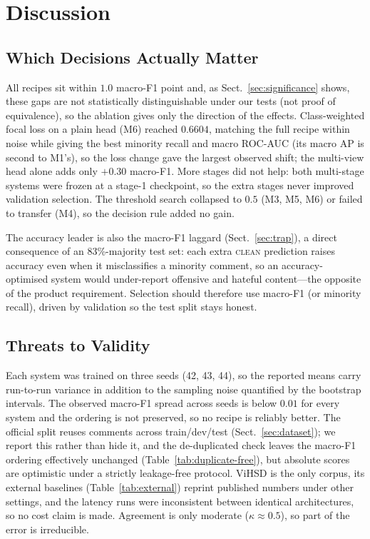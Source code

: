 \section{Discussion}
\label{sec:discussion}

\subsection{Which Decisions Actually Matter}
All recipes sit within $1.0$ macro-F1 point and, as
Sect.~\ref{sec:significance} shows, these gaps are not statistically
distinguishable under our tests (not proof of equivalence), so the ablation gives
only the direction of the effects.
Class-weighted focal loss on a plain head (M6) reached $0.6604$, matching the full
recipe within noise while giving the best minority recall and macro ROC-AUC (its
macro AP is second to M1's), so
the loss change gave the largest observed shift; the multi-view
head alone adds only $+0.30$ macro-F1.  More stages did not help: both
multi-stage systems were frozen
at a stage-1 checkpoint, so the extra stages never improved validation selection.
The threshold search collapsed to
$0.5$ (M3, M5, M6) or failed to transfer (M4), so the decision rule added no gain.

The accuracy leader is also the macro-F1 laggard (Sect.~\ref{sec:trap}), a direct
consequence of an 83\%-majority test set: each extra \textsc{clean} prediction
raises accuracy even when it misclassifies a minority comment, so an
accuracy-optimised system would under-report offensive and hateful content---the
opposite of the product requirement.  Selection should therefore use macro-F1 (or
minority recall), driven by validation so the test split stays honest.

\subsection{Threats to Validity}
\label{sec:threats}
Each system was trained on three seeds (42, 43, 44), so the reported means carry
run-to-run variance in addition to the sampling noise quantified by the bootstrap
intervals.  The observed macro-F1 spread across seeds is below $0.01$ for every
system and the ordering is not preserved, so no recipe is reliably better.  The official split reuses comments
across train/dev/test (Sect.~\ref{sec:dataset}); we report this rather than hide it,
and the de-duplicated check leaves the macro-F1 ordering effectively unchanged
(Table~\ref{tab:duplicate-free}), but absolute scores are
optimistic under a strictly leakage-free protocol.  ViHSD is the only corpus, its
external baselines (Table~\ref{tab:external}) reprint published numbers under other
settings, and the latency runs were inconsistent between identical architectures,
so no cost claim is made.  Agreement is only moderate ($\kappa\approx0.5$), so part
of the error is irreducible.

